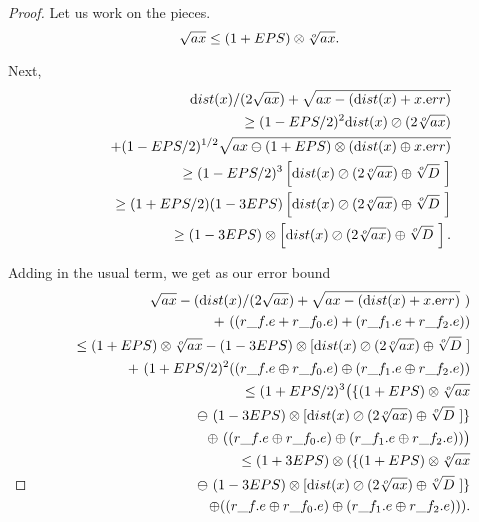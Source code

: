 \begin{proof}{}
Let us work on the pieces.
$$\sqrt {ax} \le (1 + EPS) \otimes \root o \of {ax}.$$

Next,
\begin{eqnarray*}
&&{\textrm dist}(x)/(2 \sqrt {ax}) + \sqrt {ax - ({\textrm dist}(x) + x.{\textrm err})}\\
&&\quad 
\ge  (1 - EPS/2)^2 {\textrm dist}(x) \oslash (2 \root o \of {ax}) 
\\
&&\qquad + (1 - EPS/2)^{1/2}\sqrt {ax \ominus (1+EPS) \otimes ({\textrm dist}(x) \oplus x.{\textrm err})}
                                              \\
&&\quad \ge(1 - EPS/2)^3 \left[{\textrm dist}(x) \oslash (2 \root o \of {ax}) \oplus \root o \of {D}\
\right]\\
&&\quad \ge (1 + EPS/2) (1 - 3EPS) \left[{\textrm dist}(x) \oslash (2 \root o \of {ax}) \oplus \root o \of {D}\ \right]\\
&&\quad \ge (1 -
3EPS) \otimes \left[{\textrm dist}(x) \oslash (2 \root o \of {ax}) \oplus \root o \of {D}\ \right].
\end{eqnarray*}

Adding in the usual term, we get as our error bound
\begin{eqnarray*}
&&\sqrt {ax} - ({\textrm dist}(x)/(2 \sqrt {ax}) + \sqrt {ax - ({\textrm dist}(x) + x.{\textrm err})}\ )\\
&&\qquad+\ ((r\_f.e + r\_f_0.e) + (r\_f_1.e + r\_f_2.e))\\
&&\quad \le (1 + EPS) \otimes \root o \of {ax} 
- (1 - 3EPS) \otimes [{\textrm dist}(x) \oslash (2 \root o \of {ax}) \oplus 
\root o \of {D}\ ]
\\
&&\qquad+\ (1 + EPS/2)^2 ((r\_f.e \oplus r\_f_0.e) \oplus (r\_f_1.e \oplus r\_f_2.e))
      \\
&&\quad \le (1 + EPS/2)^3 \big(\{(1 + EPS) \otimes \root o \of {ax} \\
&&\qquad 
\ominus\ (1 - 3EPS) \otimes [{\textrm dist}(x) \oslash (2 \root o \of {ax}) \oplus \root o \of {D}\ ]\}
\\
&&\qquad \oplus\ ((r\_f.e \oplus r\_f_0.e) \oplus (r\_f_1.e \oplus r\_f_2.e))\big)
 \\
&&\quad \le (1 + 3EPS) \otimes (
\{(1 + EPS) \otimes \root o \of {ax} 
\\
&&\qquad\ominus\ (1 - 3EPS) \otimes [{\textrm dist}(x) \oslash (2 \root o \of {ax})\oplus \root o \of {D}\ ]\}
\\
&&\qquad \oplus ((r\_f.e \oplus r\_f_0.e) \oplus (r\_f_1.e \oplus r\_f_2.e))
                                                ).\\
\noalign{\vskip-36pt}
\end{eqnarray*}
\end{proof}



